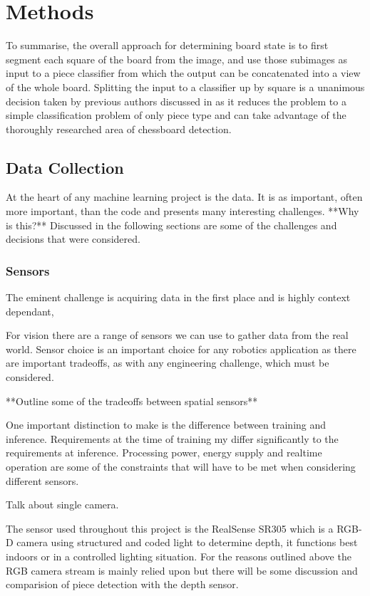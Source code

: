 \chapter{Methods}
\label{methods}

To summarise, the overall approach for determining board state is to first segment each square of the board from the image,
and use those subimages as input to a piece classifier from which the output can be concatenated into a view of the whole board.
Splitting the input to a classifier up by square is a unanimous decision taken by previous authors discussed in  
as it reduces the problem to a simple classification problem of only piece type and can take advantage of the thoroughly researched area 
of chessboard detection.

\section{Data Collection}
At the heart of any machine learning project is the data.  
It is as important, often more important, than the code and presents many interesting
challenges.  **Why is this?**
Discussed in the following sections are some of the challenges and decisions that were considered.

\subsection{Sensors}
The eminent challenge is acquiring data in the first place and is highly context dependant,

For vision there are a range of sensors we can use to gather data from the real world.
Sensor choice is an important choice for any robotics application as there are 
important tradeoffs, as with any engineering challenge, which must be considered.

**Outline some of the tradeoffs between spatial sensors**

One important distinction to make is the difference between training and inference.
Requirements at the time of training my differ significantly to the requirements at 
inference.  Processing power, energy supply and realtime operation are some
of the constraints that will have to be met when considering different sensors.

Talk about single camera. 

The sensor used throughout this project is the RealSense SR305 which is a RGB-D camera
using structured and coded light to determine depth, it functions best indoors or in a 
controlled lighting situation.  For the reasons outlined above the RGB camera stream is 
mainly relied upon but there will be some discussion and comparision of piece detection 
with the depth sensor.  


